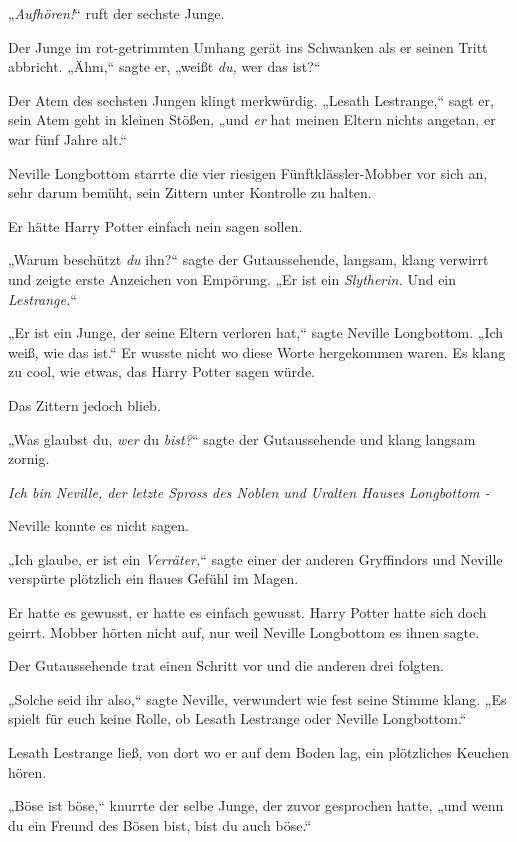 {„\emph{Aufhören!}“ ruft der sechste Junge.

Der Junge im rot-getrimmten Umhang gerät ins Schwanken als er seinen Tritt abbricht. „Ähm,“ sagte er, „weißt \emph{du,} wer das ist?“

Der Atem des sechsten Jungen klingt merkwürdig. „Lesath Lestrange,“ sagt er, sein Atem geht in kleinen Stößen, „und \emph{er} hat meinen Eltern nichts angetan, er war fünf Jahre alt.“

\later

Neville Longbottom starrte die vier riesigen Fünftklässler-Mobber vor sich an, sehr darum bemüht, sein Zittern unter Kontrolle zu halten.

Er hätte Harry Potter einfach nein sagen sollen.

„Warum beschützt \emph{du} ihn?“ sagte der Gutaussehende, langsam, klang verwirrt und zeigte erste Anzeichen von Empörung. „Er ist ein \emph{Slytherin.} Und ein \emph{Lestrange.}“

„Er ist ein Junge, der seine Eltern verloren hat,“ sagte Neville Longbottom. „Ich weiß, wie das ist.“ Er wusste nicht wo diese Worte hergekommen waren. Es klang zu cool, wie etwas, das Harry Potter sagen würde.

Das Zittern jedoch blieb.

„Was glaubst du, \emph{wer} du \emph{bist?}“ sagte der Gutaussehende und klang langsam zornig.

\emph{Ich bin Neville, der letzte Spross des Noblen und Uralten Hauses Longbottom -}

Neville konnte es nicht sagen.

„Ich glaube, er ist ein \emph{Verräter,}“ sagte einer der anderen Gryffindors und Neville verspürte plötzlich ein flaues Gefühl im Magen.

Er hatte es gewusst, er hatte es einfach gewusst. Harry Potter hatte sich doch geirrt. Mobber hörten nicht auf, nur weil Neville Longbottom es ihnen sagte.

Der Gutaussehende trat einen Schritt vor und die anderen drei folgten.

„Solche seid ihr also,“ sagte Neville, verwundert wie fest seine Stimme klang. „Es spielt für euch keine Rolle, ob Lesath Lestrange oder Neville Longbottom.“

Lesath Lestrange ließ, von dort wo er auf dem Boden lag, ein plötzliches Keuchen hören.

„Böse ist böse,“ knurrte der selbe Junge, der zuvor gesprochen hatte, „und wenn du ein Freund des Bösen bist, bist du auch böse.“

}
